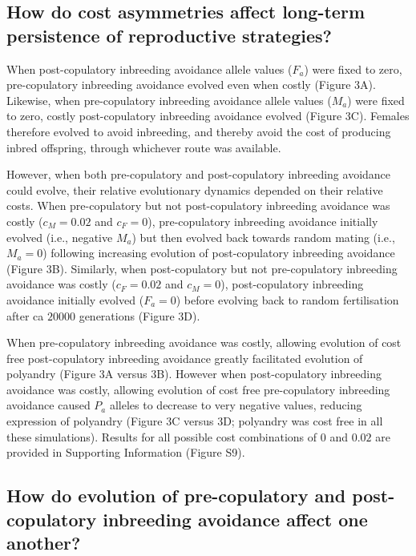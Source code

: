 \documentclass[12pt]{article}
\begin{document}
\subsection*{How do cost asymmetries affect long-term persistence of reproductive strategies?}

When post-copulatory inbreeding avoidance allele values ($F_{a}$) were fixed to zero, pre-copulatory inbreeding avoidance evolved even when costly (Figure 3A). Likewise, when pre-copulatory inbreeding avoidance allele values ($M_{a}$) were fixed to zero, costly post-copulatory inbreeding avoidance evolved (Figure 3C). Females therefore evolved to avoid inbreeding, and thereby avoid the cost of producing inbred offspring, through whichever route was available. 

However, when both pre-copulatory and post-copulatory inbreeding avoidance could evolve, their relative evolutionary dynamics depended on their relative costs. When pre-copulatory but not post-copulatory inbreeding avoidance was costly ($c_{M}=0.02$ and $c_{F}=0$), pre-copulatory inbreeding avoidance initially evolved (i.e., negative $M_{a}$) but then evolved back towards random mating (i.e., $M_{a}=0$) following increasing evolution of post-copulatory inbreeding avoidance (Figure 3B). Similarly, when post-copulatory but not pre-copulatory inbreeding avoidance was costly ($c_{F}=0.02$ and $c_{M}=0$), post-copulatory inbreeding avoidance initially evolved ($F_{a}=0$) before evolving back to random fertilisation after ca $20000$ generations (Figure 3D).

When pre-copulatory inbreeding avoidance was costly, allowing evolution of cost free post-copulatory inbreeding avoidance greatly facilitated evolution of polyandry (Figure 3A versus 3B). However when post-copulatory inbreeding avoidance was costly, allowing evolution of cost free pre-copulatory inbreeding avoidance caused $P_{a}$ alleles to decrease to very negative values, reducing expression of polyandry (Figure 3C versus 3D; polyandry was cost free in all these simulations). Results for all possible cost combinations of $0$ and $0.02$ are provided in Supporting Information (Figure S9).

\subsection*{How do evolution of pre-copulatory and post-copulatory inbreeding avoidance affect one another?}
\end{document}
